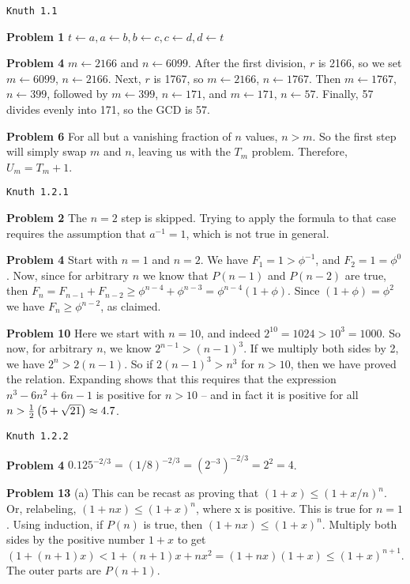 \topglue 0.5in
\centerline{\tt Knuth 1.1}
\vskip 0.5in

\noindent
{\bf Problem 1} $t \leftarrow a, a \leftarrow b, b \leftarrow c, c \leftarrow d, d \leftarrow t$

\vskip 0.1in
\noindent
{\bf Problem 4} $m \leftarrow 2166$ and $n \leftarrow 6099$.  After the first division, $r$ is 
2166, so we set $m \leftarrow 6099$, $n \leftarrow 2166$.  Next, $r$ is 1767, so 
$m \leftarrow 2166$, $n \leftarrow 1767$.  Then $m \leftarrow 1767$, $n \leftarrow 399$,
followed by $m \leftarrow 399$, $n \leftarrow 171$, and $m \leftarrow 171$, $n\leftarrow 57$.
Finally, 57 divides evenly into 171, so the GCD is 57.

\vskip 0.1in
\noindent
{\bf Problem 6} For all but a vanishing fraction of $n$ values, $n > m$.  So the first step
will simply swap $m$ and $n$, leaving us with the $T_m$ problem.  Therefore, $U_m = T_m+1$.

\vskip 0.5in
\centerline{\tt Knuth 1.2.1}
\vskip 0.5in

\noindent
{\bf Problem 2} The $n=2$ step is skipped.  Trying to apply the formula to that case
 requires the assumption that $a^{-1} = 1$, which is not true in general.

\vskip 0.1in
\noindent
{\bf Problem 4}  Start with $n=1$ and $n=2$.  We have $F_1 = 1 > \phi^{-1}$, 
 and $F_2 = 1 = \phi^0$.  Now, since for arbitrary $n$ we know that $P\left(n-1\right)$
 and $P\left(n-2\right)$ are true, then $F_n = F_{n-1}+F_{n-2} \ge \phi^{n-4} + \phi^{n-3}
 = \phi^{n-4} \left(1 + \phi\right)$.  Since $\left(1 + \phi\right) = \phi^2$
 we have $F_n \ge \phi^{n-2}$, as claimed.

\vskip 0.1in
\noindent
{\bf Problem 10} Here we start with $n=10$, and indeed $2^{10} = 1024 > 10^3 = 1000$.
 So now, for arbitrary $n$, we know $2^{n-1} > \left(n-1\right)^3$.  If we multiply
 both sides by 2, we have $2^n > 2 \left(n-1\right)$.  So if $2 \left(n-1\right)^3 > n^3$
 for $n > 10$, then we have proved the relation.  Expanding shows that this requires
 that the expression $n^3 - 6 n^2 + 6n - 1$ is positive for $n > 10$ -- and in fact
 it is positive for all $n > {1 \over 2} \left( 5 + \sqrt{21} \right) \approx 4.7$.

\vskip 0.5in
\centerline{\tt Knuth 1.2.2}
\vskip 0.5in

\noindent
{\bf Problem 4} $0.125^{-2/3} = \left(1/8\right)^{-2/3} = \left(2^{-3}\right)^{-2/3} = 2^{2} = 4$.

\vskip 0.1in
\noindent
{\bf Problem 13} (a) This can be recast as proving that 
  $\left(1+x\right) \le \left(1 + x/n\right)^n$.
  Or, relabeling, $\left(1+n x \right) \le \left(1+x\right)^n$, where x is positive.  This
  is true for $n=1$.  Using induction, if $P\left(n\right)$ is true, then $\left(1+n x \right) \le
  \left(1+x\right)^n$.  Multiply both sides by the positive number $1+x$ to get
  $ \left( 1 + \left(n+1\right) x \right) < 1 + \left(n+1\right) x + n x^2 = 
  \left(1+n x\right) \left(1 + x\right) \le \left(1+x\right)^{n+1}$.  The outer parts are
  $P\left(n+1\right)$.
  
